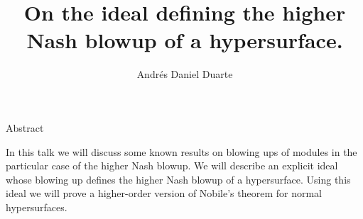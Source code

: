 \documentclass[a4paper,12pt]{article}
\begin{document}
\title{On the ideal defining the higher Nash blowup of a hypersurface.
}
\author{Andr\' es Daniel Duarte}
\date{}
\maketitle

\begin{center}
{\Large Abstract}
\end{center}
In this talk we will discuss some known results on blowing ups of modules in the particular case of the higher Nash blowup. We will describe an explicit ideal whose blowing up defines the higher Nash blowup of a hypersurface. Using this ideal we will prove a higher-order version of Nobile's theorem for normal hypersurfaces.
\end{document}
